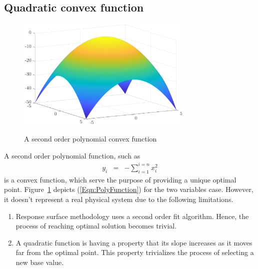 \documentclass[letterpaper, 12pt]{article}
\begin{document}
	\subsection{Quadratic convex function}
	\begin{figure}
		\centering
		\includegraphics[width=0.75\textwidth]{Matlab/poly-2-var}
		\label{Fig:TwoVariablePolynomial}
		\caption{A second order polynomial convex function}
	\end{figure}
	A second order polynomial function, such as
	\begin{eqnarray}
	y_i &=& -\sum_{i=1}^{i=n}{x_i^2} \label{Eqn:PolyFunction}
	\end{eqnarray}
	is a convex function, which serve the purpose of providing a unique optimal point. Figure~\ref{Fig:TwoVariablePolynomial} depicts (\ref{Eqn:PolyFunction}) for the two variables case. However, it doesn't represent a real physical system due to the following limitations.
	\begin{enumerate}
		\item Response surface methodology uses a second order fit algorithm. Hence, the process of reaching optimal solution becomes trivial.
		\item A quadratic function is having a property that its slope increases as it moves far from the optimal point. This property trivializes the process of selecting a new base value.
	\end{enumerate}
\end{document}
